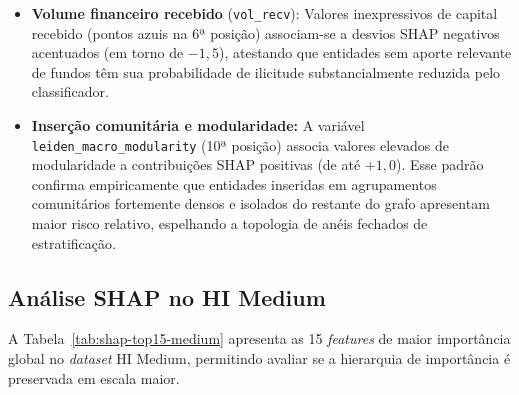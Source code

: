 \documentclass[a4paper,12pt,oneside,onecolumn,final,fleqn]{repUERJ}
\begin{document}
\begin{itemize}
    \item \textbf{Volume financeiro recebido} (\texttt{vol\_recv}): Valores inexpressivos de capital recebido (pontos azuis na 6ª posição) associam-se a desvios SHAP negativos acentuados (em torno de $-1{,}5$), atestando que entidades sem aporte relevante de fundos têm sua probabilidade de ilicitude substancialmente reduzida pelo classificador.
    
    \item \textbf{Inserção comunitária e modularidade:} A variável \texttt{leiden\_macro\_modularity} (10ª posição) associa valores elevados de modularidade a contribuições SHAP positivas (de até $+1{,}0$). Esse padrão confirma empiricamente que entidades inseridas em agrupamentos comunitários fortemente densos e isolados do restante do grafo apresentam maior risco relativo, espelhando a topologia de anéis fechados de estratificação.
\end{itemize}

\subsection{Análise SHAP no HI Medium}

A Tabela~\ref{tab:shap-top15-medium} apresenta as 15 \textit{features} de maior importância global no \textit{dataset} HI Medium, permitindo avaliar se a hierarquia de importância é preservada em escala maior.
\end{document}

